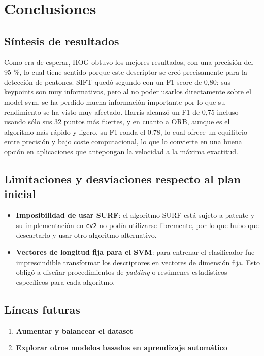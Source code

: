 \documentclass[a4paper]{article}
\begin{document}
\section{Conclusiones}

\subsection{Síntesis de resultados}

Como era de esperar, HOG obtuvo los mejores resultados, con una precisión del 95 \%, lo cual tiene sentido 
porque este descriptor se creó precisamente para la detección de peatones. 
SIFT quedó segundo con un F1-score de 0,80: sus keypoints son muy informativos, pero al no poder usarlos directamente sobre el model svm,
se ha perdido mucha información importante por lo que su rendimiento se ha visto muy afectado. Harris alcanzó un F1 de 0,75 incluso usando sólo sus 32 puntos más fuertes, 
y en cuanto a ORB, aunque es el algoritmo más rápido y ligero, su F1 ronda el 0.78, lo cual ofrece un equilibrio entre precisión y bajo coste computacional, lo que lo convierte en una buena opción en aplicaciones que antepongan la velocidad a la máxima exactitud.

\subsection{Limitaciones y desviaciones respecto al plan inicial}

\begin{itemize}
    \item \textbf{Imposibilidad de usar SURF}: el algoritmo SURF está sujeto a patente y su implementación en \texttt{cv2} no podía utilizarse libremente, por lo que hubo que descartarlo y usar otro algoritmo alternativo.
    
    \item \textbf{Vectores de longitud fija para el SVM}: para entrenar el clasificador fue imprescindible transformar los descriptores en vectores de dimensión fija. Esto obligó a diseñar procedimientos de \emph{padding} o resúmenes estadísticos específicos para cada algoritmo.
\end{itemize}


\subsection{Líneas futuras}

\begin{enumerate}
    \item \textbf{Aumentar y balancear el dataset}
    \item \textbf{Explorar otros modelos basados en aprendizaje automático}
\end{enumerate}
\end{document}
